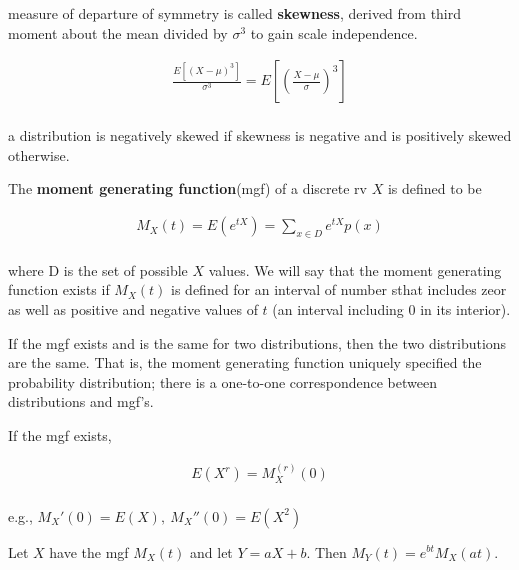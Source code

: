 \begin{definition}
    measure of departure of symmetry is called \textbf{skewness}, derived from third moment about the mean divided by $\sigma ^ 3$ to gain scale independence.

    \begin{align*}
        \frac{E\left[(X-\mu) ^ 3\right]}{\sigma ^ 3} = E\left[\left(\frac{X-\mu}{\sigma}\right)^3\right]\\
    \end{align*}

    a distribution is negatively skewed if skewness is negative and is positively skewed otherwise.
\end{definition}

\begin{definition}
    The \textbf{moment generating function}(mgf) of a discrete rv $X$ is defined to be

    \begin{align*}
        M_X(t) = E(e^{tX}) = \sum\limits_{x\in D}e^{tX}p(x)\\
    \end{align*}

    where D is the set of possible $X$ values. We will say that the moment generating function exists if $M_X(t)$ is defined for an interval of number sthat includes zeor as well as positive and negative values of $t$ (an interval including 0 in its interior).
\end{definition}

\begin{proposition}
    If the mgf exists and is the same for two distributions, then the two distributions are the same. That is, the moment generating function uniquely specified the probability distribution; there is a one-to-one correspondence between distributions and mgf's.
\end{proposition}

\begin{theorem}
    If the mgf exists,

    \begin{align*}
        E(X^r) = M_X^{(r)}(0)\\
    \end{align*}

    e.g., $M_X'(0) = E(X),\ M_X''(0) = E(X ^ 2)$
\end{theorem}

\begin{proposition}
    Let $X$ have the mgf $M_X(t)$ and let $Y=aX+b$. Then $M_Y(t) = e^{bt}M_X(at)$.
\end{proposition}

